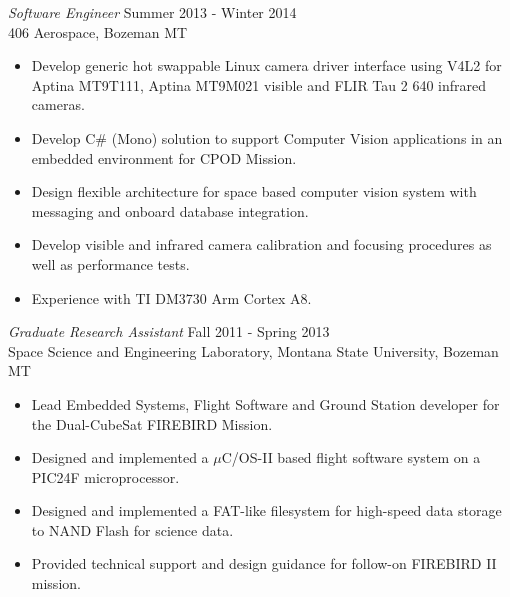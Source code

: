 \documentclass[line,margin]{res}
\begin{document}
\begin{resume}
				{\sl Software Engineer} \hfill Summer 2013 - Winter 2014 \\
                  406 Aerospace, Bozeman MT
                 \begin{itemize}  \itemsep -2pt %
                 \item Develop generic hot swappable Linux camera driver interface using V4L2 for Aptina MT9T111, Aptina MT9M021 visible and FLIR Tau 2 640 infrared cameras. 
                 \item Develop C\# (Mono) solution to support Computer Vision applications in an embedded environment for CPOD Mission.
                 \item Design flexible architecture for space based computer vision system with messaging and onboard database integration.
                 \item Develop visible and infrared camera calibration and focusing procedures as well as performance tests.
                 \item Experience with TI DM3730 Arm Cortex A8.
                 
                \end{itemize}


                 {\sl Graduate Research Assistant} \hfill Fall 2011 - Spring 2013 \\
                Space Science and Engineering Laboratory,
                Montana State University, Bozeman MT
                 \begin{itemize}  \itemsep -2pt %
                 \item Lead Embedded Systems, Flight Software and Ground Station developer for the Dual-CubeSat FIREBIRD Mission.
                 \item Designed and implemented a $\mu$C/OS-II based flight software system on a PIC24F microprocessor.
	      		 \item Designed and implemented a FAT-like filesystem for high-speed data storage to NAND Flash for science data.
	      		 \item Provided technical support and design guidance for follow-on FIREBIRD II mission.
                 
                \end{itemize}
 
                 

\end{resume}
\end{document}
